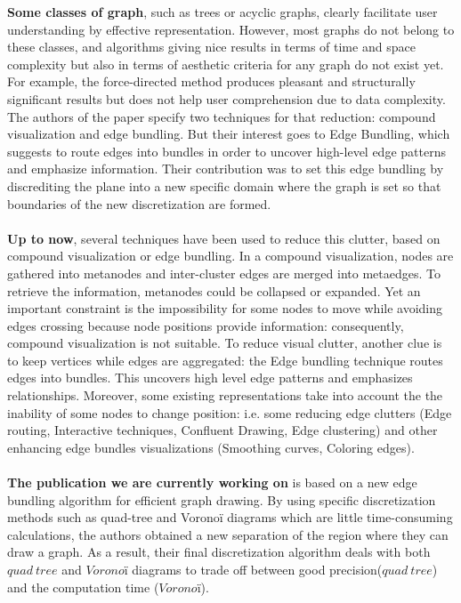 \textbf{Some classes of graph}, such as trees or acyclic graphs, clearly facilitate user understanding by effective representation. However, most graphs do not belong to these classes, and algorithms giving nice results in terms of time and space complexity but also in terms of aesthetic criteria for any graph do not exist yet. For example, the force-directed method produces pleasant and structurally significant results but does not help user comprehension due to data complexity. The authors of the paper specify two techniques for that reduction: compound visualization and edge bundling. But their interest goes to Edge Bundling, which suggests to route edges into bundles in order to uncover high-level edge patterns and emphasize information. Their contribution was to set this edge bundling by discrediting the plane into a new specific domain where the graph is set so that boundaries of the new discretization are formed.
\\
\\
\textbf{Up to now}, several techniques have been used to reduce this clutter, based on compound visualization or edge bundling. In a compound visualization, nodes are gathered into metanodes and inter-cluster edges are merged into metaedges. To retrieve the information, metanodes could be collapsed or expanded. Yet an important constraint is the impossibility for some nodes to move while avoiding edges crossing because node positions provide information: consequently, compound visualization is not suitable. To reduce visual clutter, another clue is to keep vertices while edges are aggregated: the Edge bundling technique routes edges into bundles. This uncovers high level edge patterns and emphasizes relationships. Moreover, some existing representations take into account the the inability of some nodes to change position: i.e.  some reducing edge clutters (Edge routing, Interactive techniques, Confluent Drawing, Edge clustering) and other enhancing edge bundles visualizations (Smoothing curves, Coloring edges). 
\\
\\
\textbf{The publication we are currently working on} is based on a new edge bundling algorithm for efficient graph drawing. By using specific  discretization methods such as quad-tree and Voronoï diagrams which are little time-consuming calculations, the authors obtained a new separation of the region where they can draw a graph. As a result, their final discretization algorithm deals with both $quad~tree$ and $Voronoï$ diagrams to trade off between good precision($quad~tree$) and the computation time ($Voronoï$).

